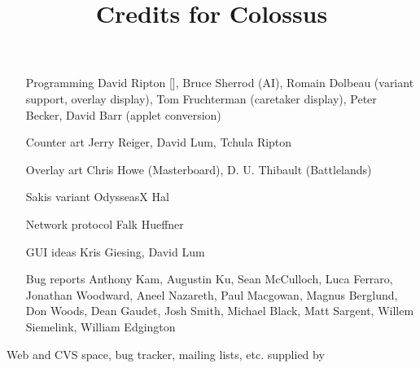 \documentclass{article}
\begin{document}

\title{Credits for Colossus}

\maketitle

\begin{itemize}

\item[Programming] David Ripton [], Bruce Sherrod (AI), Romain Dolbeau (variant support, overlay display), Tom Fruchterman (caretaker display), Peter Becker, David Barr (applet conversion)

\item[Counter art] Jerry Reiger, David Lum, Tchula Ripton

\item[Overlay art] Chris Howe (Masterboard), D. U. Thibault (Battlelands)

\item[Sakis variant] OdysseasX Hal

\item[Network protocol] Falk Hueffner

\item[GUI ideas] Kris Giesing, David Lum

\item[Bug reports] Anthony Kam, Augustin Ku, Sean McCulloch, Luca Ferraro, Jonathan Woodward, Aneel Nazareth, Paul Macgowan, Magnus Berglund, Don Woods, Dean Gaudet, Josh Smith, Michael Black, Matt Sargent, Willem Siemelink, William Edgington

\end{itemize}

Web and CVS space, bug tracker, mailing lists, etc. supplied by 
\end{document}
